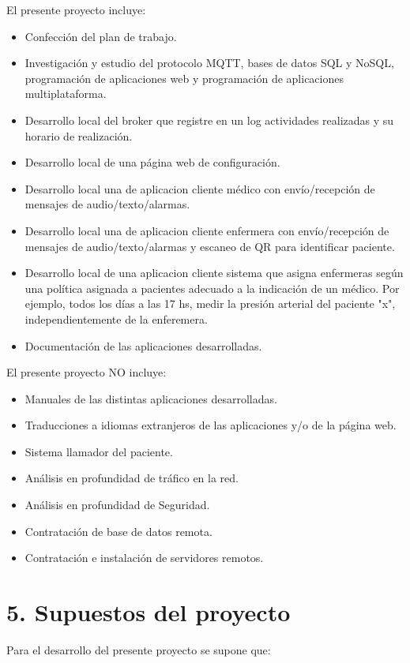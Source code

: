 \documentclass[
11pt, %
]{charter}
\begin{document}
El presente proyecto incluye:

\begin{itemize}
	\item Confección del plan de trabajo. 
	\item Investigación y estudio del protocolo MQTT, bases de datos SQL y NoSQL, programación de aplicaciones web y programación de aplicaciones multiplataforma.	
	\item Desarrollo local del broker que registre en un log actividades realizadas y su horario de realización. 
	\item Desarrollo local de una página web de configuración.
	\item Desarrollo local una de aplicacion cliente médico con envío/recepción de mensajes de audio/texto/alarmas.
	\item Desarrollo local una de aplicacion cliente enfermera con envío/recepción de mensajes de audio/texto/alarmas y escaneo de QR para identificar paciente. 
	\item Desarrollo local de una aplicacion cliente sistema que asigna enfermeras según una política asignada a pacientes adecuado a la indicación de un médico. Por ejemplo, todos los días a las 17 hs, medir la presión arterial del paciente "x", independientemente de la enferemera.
	\item Documentación de las aplicaciones desarrolladas.

\end{itemize}

El presente proyecto NO incluye:
\begin{itemize}
	\item Manuales de las distintas aplicaciones desarrolladas.
	\item Traducciones a idiomas extranjeros de las aplicaciones y/o de la página web.
	\item Sistema llamador del paciente.
	\item Análisis en profundidad de tráfico en la red.
	\item Análisis en profundidad de Seguridad.
	\item Contratación de base de datos remota.
	\item Contratación e instalación de servidores remotos.
\end{itemize}



\section{5. Supuestos del proyecto}
\label{sec:supuestos}
Para el desarrollo del presente proyecto se supone que: 
\end{document}
